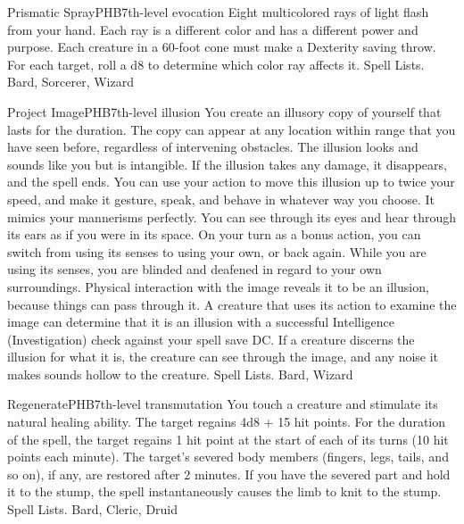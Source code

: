 \begin{spell}{Prismatic Spray}{PHB}{7th-level evocation}
{
}
Eight multicolored rays of light flash from your hand. Each ray is a different color and has a different power and purpose. Each creature in a 60-foot cone must make a Dexterity saving throw. For each target, roll a d8 to determine which color ray affects it.
Spell Lists. Bard, Sorcerer, Wizard
\end{spell}

\begin{spell}{Project Image}{PHB}{7th-level illusion}
{
}
You create an illusory copy of yourself that lasts for the duration. The copy can appear at any location within range that you have seen before, regardless of intervening obstacles. The illusion looks and sounds like you but is intangible. If the illusion takes any damage, it disappears, and the spell ends.
You can use your action to move this illusion up to twice your speed, and make it gesture, speak, and behave in whatever way you choose. It mimics your mannerisms perfectly.
You can see through its eyes and hear through its ears as if you were in its space. On your turn as a bonus action, you can switch from using its senses to using your own, or back again. While you are using its senses, you are blinded and deafened in regard to your own surroundings.
Physical interaction with the image reveals it to be an illusion, because things can pass through it. A creature that uses its action to examine the image can determine that it is an illusion with a successful Intelligence (Investigation) check against your spell save DC. If a creature discerns the illusion for what it is, the creature can see through the image, and any noise it makes sounds hollow to the creature.
Spell Lists. Bard, Wizard
\end{spell}

\begin{spell}{Regenerate}{PHB}{7th-level transmutation}
{
}
You touch a creature and stimulate its natural healing ability. The target regains 4d8 + 15 hit points. For the duration of the spell, the target regains 1 hit point at the start of each of its turns (10 hit points each minute).
The target’s severed body members (fingers, legs, tails, and so on), if any, are restored after 2 minutes. If you have the severed part and hold it to the stump, the spell instantaneously causes the limb to knit to the stump.
Spell Lists. Bard, Cleric, Druid
\end{spell}

